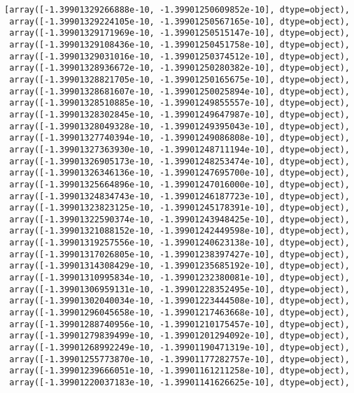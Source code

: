 \documentclass[11pt]{article}
\makeatletter
\newcommand{\boxspacing}{\kern\kvtcb@left@rule\kern\kvtcb@boxsep}
\newcommand{\prompt}[4]{
        \ttfamily\llap{{\color{#2}[#3]:\hspace{3pt}#4}}\vspace{-\baselineskip}
    }
\makeatother
\begin{document}
            \begin{tcolorbox}[breakable, size=fbox, boxrule=.5pt, pad at break*=1mm, opacityfill=0]
\prompt{Out}{outcolor}{9}{\boxspacing}
\begin{Verbatim}[commandchars=\\\{\}]
[array([-1.39901329266888e-10, -1.39901250609852e-10], dtype=object),
 array([-1.39901329224105e-10, -1.39901250567165e-10], dtype=object),
 array([-1.39901329171969e-10, -1.39901250515147e-10], dtype=object),
 array([-1.39901329108436e-10, -1.39901250451758e-10], dtype=object),
 array([-1.39901329031016e-10, -1.39901250374512e-10], dtype=object),
 array([-1.39901328936672e-10, -1.39901250280382e-10], dtype=object),
 array([-1.39901328821705e-10, -1.39901250165675e-10], dtype=object),
 array([-1.39901328681607e-10, -1.39901250025894e-10], dtype=object),
 array([-1.39901328510885e-10, -1.39901249855557e-10], dtype=object),
 array([-1.39901328302845e-10, -1.39901249647987e-10], dtype=object),
 array([-1.39901328049328e-10, -1.39901249395043e-10], dtype=object),
 array([-1.39901327740394e-10, -1.39901249086808e-10], dtype=object),
 array([-1.39901327363930e-10, -1.39901248711194e-10], dtype=object),
 array([-1.39901326905173e-10, -1.39901248253474e-10], dtype=object),
 array([-1.39901326346136e-10, -1.39901247695700e-10], dtype=object),
 array([-1.39901325664896e-10, -1.39901247016000e-10], dtype=object),
 array([-1.39901324834743e-10, -1.39901246187723e-10], dtype=object),
 array([-1.39901323823125e-10, -1.39901245178391e-10], dtype=object),
 array([-1.39901322590374e-10, -1.39901243948425e-10], dtype=object),
 array([-1.39901321088152e-10, -1.39901242449598e-10], dtype=object),
 array([-1.39901319257556e-10, -1.39901240623138e-10], dtype=object),
 array([-1.39901317026805e-10, -1.39901238397427e-10], dtype=object),
 array([-1.39901314308429e-10, -1.39901235685192e-10], dtype=object),
 array([-1.39901310995834e-10, -1.39901232380081e-10], dtype=object),
 array([-1.39901306959131e-10, -1.39901228352495e-10], dtype=object),
 array([-1.39901302040034e-10, -1.39901223444508e-10], dtype=object),
 array([-1.39901296045658e-10, -1.39901217463668e-10], dtype=object),
 array([-1.39901288740956e-10, -1.39901210175457e-10], dtype=object),
 array([-1.39901279839499e-10, -1.39901201294092e-10], dtype=object),
 array([-1.39901268992249e-10, -1.39901190471319e-10], dtype=object),
 array([-1.39901255773870e-10, -1.39901177282757e-10], dtype=object),
 array([-1.39901239666051e-10, -1.39901161211258e-10], dtype=object),
 array([-1.39901220037183e-10, -1.39901141626625e-10], dtype=object),

\end{Verbatim}
\end{tcolorbox}
\end{document}
